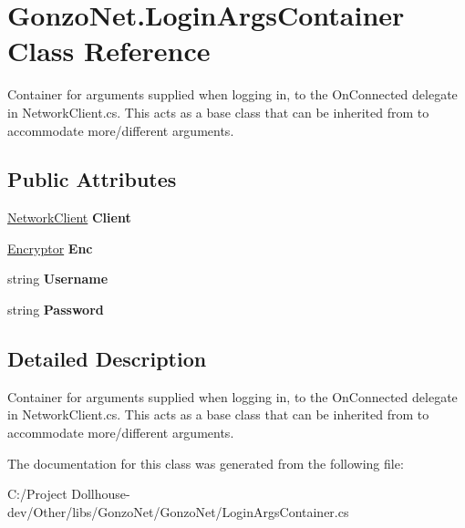 \hypertarget{class_gonzo_net_1_1_login_args_container}{\section{Gonzo\+Net.\+Login\+Args\+Container Class Reference}
\label{class_gonzo_net_1_1_login_args_container}
}


Container for arguments supplied when logging in, to the On\+Connected delegate in Network\+Client.\+cs. This acts as a base class that can be inherited from to accommodate more/different arguments.  


\subsection*{Public Attributes}
\begin{DoxyCompactItemize}
\item 
\hypertarget{class_gonzo_net_1_1_login_args_container_a0d8dbf9975976ca6a3c760af8405fed3}{\hyperlink{class_gonzo_net_1_1_network_client}{Network\+Client} {\bfseries Client}}\label{class_gonzo_net_1_1_login_args_container_a0d8dbf9975976ca6a3c760af8405fed3}

\item 
\hypertarget{class_gonzo_net_1_1_login_args_container_acc8c278dacde972b39815e47f2e8653b}{\hyperlink{class_gonzo_net_1_1_encryption_1_1_encryptor}{Encryptor} {\bfseries Enc}}\label{class_gonzo_net_1_1_login_args_container_acc8c278dacde972b39815e47f2e8653b}

\item 
\hypertarget{class_gonzo_net_1_1_login_args_container_a4d88ae34640819b5cc827b60a66311bd}{string {\bfseries Username}}\label{class_gonzo_net_1_1_login_args_container_a4d88ae34640819b5cc827b60a66311bd}

\item 
\hypertarget{class_gonzo_net_1_1_login_args_container_a2c2ba96ccc6f9c8e3ccd5a7e0a648deb}{string {\bfseries Password}}\label{class_gonzo_net_1_1_login_args_container_a2c2ba96ccc6f9c8e3ccd5a7e0a648deb}

\end{DoxyCompactItemize}


\subsection{Detailed Description}
Container for arguments supplied when logging in, to the On\+Connected delegate in Network\+Client.\+cs. This acts as a base class that can be inherited from to accommodate more/different arguments. 



The documentation for this class was generated from the following file\+:\begin{DoxyCompactItemize}
\item 
C\+:/\+Project Dollhouse-\/dev/\+Other/libs/\+Gonzo\+Net/\+Gonzo\+Net/Login\+Args\+Container.\+cs\end{DoxyCompactItemize}
